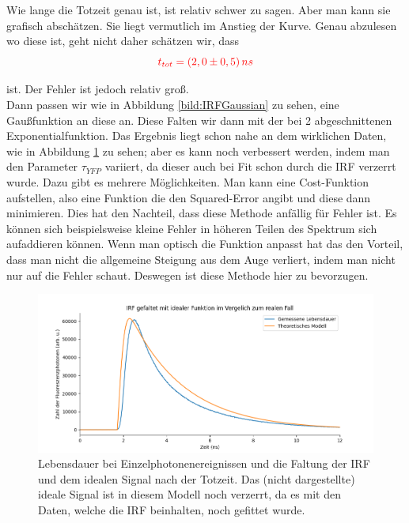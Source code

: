 Wie lange die Totzeit genau ist, ist relativ schwer zu sagen. Aber man kann sie grafisch abschätzen. Sie liegt vermutlich im Anstieg 
der Kurve. Genau abzulesen wo diese ist, geht nicht daher schätzen wir, dass\\

\begin{equation*}
    \textcolor{red}{t_{tot} = (2,0\pm0,5)\,ns}
\end{equation*}

ist. Der Fehler ist jedoch relativ groß. \\
Dann passen wir wie in Abbildung \ref{bild:IRFGaussian} zu sehen, eine Gaußfunktion an diese an. Diese Falten wir dann mit der bei 2 
abgeschnittenen Exponentialfunktion. Das Ergebnis liegt schon nahe an dem wirklichen Daten, wie in Abbildung \ref{bild:IRFconvGauss} zu sehen; aber es kann noch verbessert werden, indem man den Parameter $\tau_{YFP}$ variiert, da dieser auch bei Fit schon 
durch die IRF verzerrt wurde. Dazu gibt es mehrere Möglichkeiten. Man kann eine Cost-Funktion aufstellen, also eine Funktion die den Squared-Error angibt und diese 
dann minimieren. Dies hat den Nachteil, dass diese Methode anfällig für Fehler ist. Es können sich beispielsweise kleine Fehler in höheren 
Teilen des Spektrum sich aufaddieren können. Wenn man optisch die Funktion anpasst hat das den Vorteil, dass man nicht die allgemeine Steigung aus dem Auge 
verliert, indem man nicht nur auf die Fehler schaut. Deswegen ist diese Methode hier zu bevorzugen.\\

\begin{figure}[h]
    \centering
    \includegraphics[width = \linewidth]{Bilder/Auswertung/IRFGaussianConvol.png}
    \caption{Lebensdauer bei Einzelphotonenereignissen und die Faltung der IRF und dem idealen Signal nach der Totzeit. Das (nicht dargestellte) ideale Signal ist in diesem 
    Modell noch verzerrt, da es mit den Daten, welche die IRF beinhalten, noch gefittet wurde.}
    \label{bild:IRFconvGauss}
\end{figure}

